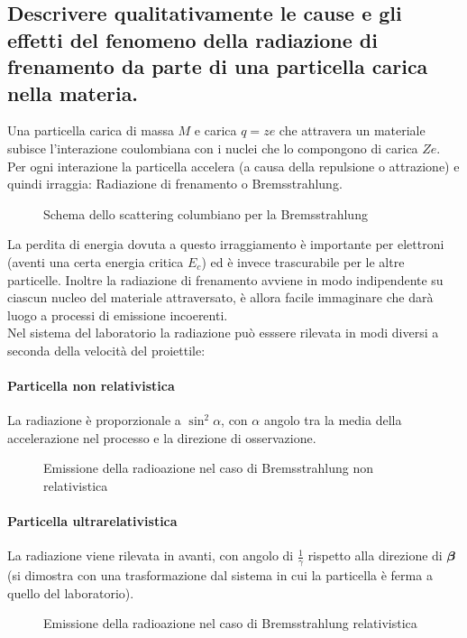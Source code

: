 \subsection[]{Descrivere qualitativamente le cause e gli effetti del fenomeno della radiazione di frenamento da parte di una particella carica nella materia.
}\label{sec:4.a.9}
Una particella carica di massa $M$ e carica $q=ze$ che attravera un materiale subisce l'interazione coulombiana con i nuclei che lo compongono di carica $Ze$.\\
Per ogni interazione la particella accelera (a causa della repulsione o attrazione) e quindi irraggia: Radiazione di frenamento o Bremsstrahlung.
\begin{figure}[H]
    \centering
    \caption{Schema dello scattering columbiano per la Bremsstrahlung}
    \label{fig:bremsstrahlung}
\end{figure}
La perdita di energia dovuta a questo irraggiamento è importante per elettroni (aventi una certa energia critica $E_{c}$) ed è invece trascurabile per le altre particelle. Inoltre la radiazione di frenamento avviene in modo indipendente su ciascun nucleo del materiale attraversato, è allora facile immaginare che darà luogo a processi di emissione incoerenti.\\
Nel sistema del laboratorio la radiazione può esssere rilevata in modi diversi a seconda della velocità del proiettile:
\paragraph{Particella non relativistica}%
La radiazione è proporzionale a $\sin^2\alpha$, con $\alpha$ angolo tra la media della accelerazione nel processo e la direzione di osservazione.
\begin{figure}[H]
    \centering
    \caption{Emissione della radioazione nel caso di Bremsstrahlung non relativistica}
    \label{fig:bremsstrahlung-non-relativistica}
\end{figure}
\paragraph{Particella ultrarelativistica}%
La radiazione viene rilevata in avanti, con angolo di $\frac{1}{\gamma}$ rispetto alla direzione di $\boldsymbol{\beta}$ (si dimostra con una trasformazione dal sistema in cui la particella è ferma a quello del laboratorio).
\begin{figure}[ht]
    \centering
    \caption{Emissione della radioazione nel caso di Bremsstrahlung relativistica}
    \label{fig:bremsstrahlung-relativistica}
\end{figure}

